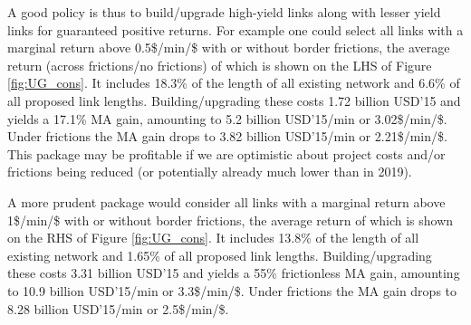 \documentclass[a4paper]{article}
\begin{document}
A good policy is thus to build/upgrade high-yield links along with lesser yield links for guaranteed positive returns. For example one could select all links with a marginal return above 0.5\$/min/\$ with or without border frictions, the average return (across frictions/no frictions) of which is shown on the LHS of Figure \ref{fig:UG_cons}. It includes 18.3\% of the length of all existing network and 6.6\% of all proposed link lengths. Building/upgrading these costs 1.72 billion USD'15 and yields a 17.1\% MA gain, amounting to 5.2 billion USD'15/min or 3.02\$/min/\$. Under frictions the MA gain drops to 3.82 billion USD'15/min or 2.21\$/min/\$. This package may be profitable if we are optimistic about project costs and/or frictions being reduced (or potentially already much lower than in 2019). \newline 

A more prudent package would consider all links with a marginal return above 1\$/min/\$ with or without border frictions, the average return of which is shown on the RHS of Figure \ref{fig:UG_cons}. It includes 13.8\% of the length of all existing network and 1.65\% of all proposed link lengths. Building/upgrading these costs 3.31 billion USD'15 and yields a 55\% frictionless MA gain, amounting to 10.9 billion USD'15/min or 3.3\$/min/\$. Under frictions the MA gain drops to 8.28 billion USD'15/min or 2.5\$/min/\$. 


\end{document}
